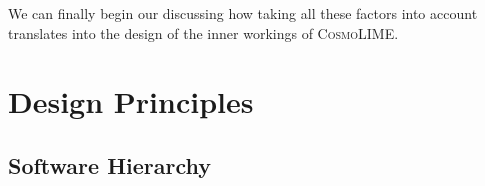 We can finally begin our discussing how taking all these factors into account translates into the design of the inner workings of \textsc{CosmoLIME}.

\section{Design Principles}
\subsection{Software Hierarchy}\label{subsec:software_hierarchy}



